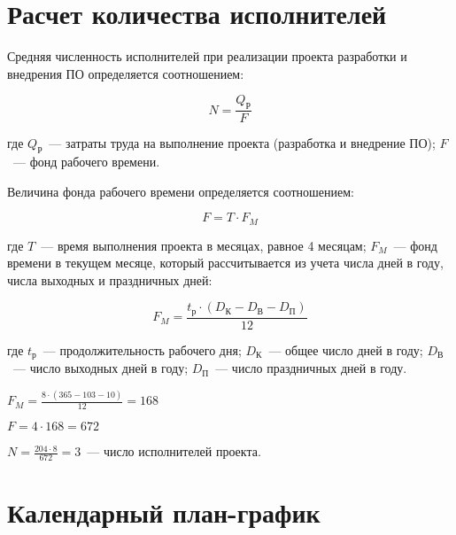 \normalsize

\section{Расчет количества исполнителей}

Средняя численность исполнителей при реализации проекта разработки и внедрения ПО определяется соотношением:

\begin{equation}
N = \frac{Q_{\text{Р}}}{F}
\label{F:N}
\end{equation}

где $Q_{\text{Р}}$~--- затраты труда на выполнение проекта (разработка и внедрение ПО); $F$~--- фонд рабочего времени.

Величина фонда рабочего времени определяется соотношением:

\begin{equation}
F = T \cdot F_M
\label{F:F}
\end{equation}

где $T$~--- время выполнения проекта в месяцах, равное 4 месяцам; $F_M$~--- фонд времени в текущем месяце, который рассчитывается из учета числа дней в году, числа выходных и праздничных дней:

\begin{equation}
F_M = \frac{t_{\text{р}} \cdot (D_{\text{К}} - D_{\text{В}} - D_{\text{П}})}{12}
\label{F:FM}
\end{equation}

где $t_{\text{р}}$~--- продолжительность рабочего дня; $D_{\text{К}}$~--- общее число дней в году; $D_{\text{В}}$~--- число выходных дней в году; $D_{\text{П}}$~--- число праздничных дней в году.

$F_M = \frac{8 \cdot (365 - 103 - 10)}{12} = 168$

$F = 4 \cdot 168 = 672$

$N = \frac{204 \cdot 8}{672} = 3$~--- число исполнителей проекта.

\section{Календарный план-график}

